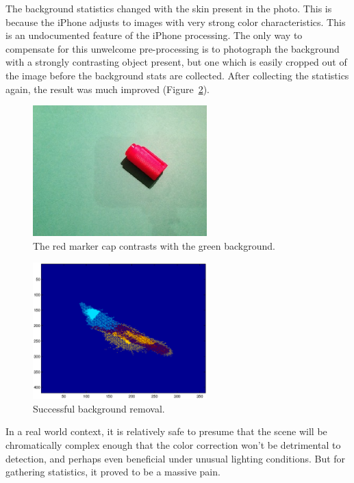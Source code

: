 The background statistics changed with the skin present in the photo. This is because the iPhone adjusts to images with very strong color characteristics. This is an undocumented feature of the iPhone processing. The only way to compensate for this unwelcome pre-processing is to photograph the background with a strongly contrasting object present, but one which is easily cropped out of the image before the background stats are collected. After collecting the statistics again, the result was much improved (Figure~\ref{fig:BGSuccess}).

\begin{figure}[h!]
  \centering
    \includegraphics[width=0.60\textwidth]{Chapter2/Figs/bg_cap.eps}
    \caption{The red marker cap contrasts with the green background.}  \label{fig:BGCap}
\end{figure}

\begin{figure}[h!]
  \centering
    \includegraphics[width=0.60\textwidth]{Chapter2/Figs/xy_bg_success.eps}
    \caption{Successful background removal.}  \label{fig:BGSuccess}
\end{figure}

In a real world context, it is relatively safe to presume that the scene will be chromatically complex enough that the color correction won't be detrimental to detection, and perhaps even beneficial under unusual lighting conditions. But for gathering statistics, it proved to be a massive pain.


